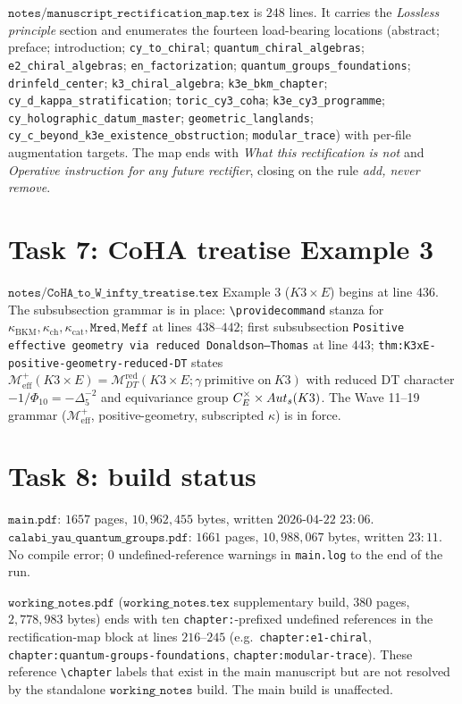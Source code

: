 \documentclass[11pt]{article}
\providecommand{\kch}{\kappa_{\mathrm{ch}}}
\providecommand{\kcat}{\kappa_{\mathrm{cat}}}
\providecommand{\kBKM}{\kappa_{\mathrm{BKM}}}
\begin{document}
$\texttt{notes/manuscript\_rectification\_map.tex}$ is $248$ lines.
It carries the \emph{Lossless principle} section and enumerates
the fourteen load-bearing locations (abstract; preface;
introduction; \texttt{cy\_to\_chiral}; \texttt{quantum\_chiral\_algebras};
\texttt{e2\_chiral\_algebras}; \texttt{en\_factorization};
\texttt{quantum\_groups\_foundations}; \texttt{drinfeld\_center};
\texttt{k3\_chiral\_algebra}; \texttt{k3e\_bkm\_chapter};
\texttt{cy\_d\_kappa\_stratification}; \texttt{toric\_cy3\_coha};
\texttt{k3e\_cy3\_programme}; \texttt{cy\_holographic\_datum\_master};
\texttt{geometric\_langlands}; \texttt{cy\_c\_beyond\_k3e\_existence\_obstruction};
\texttt{modular\_trace}) with per-file augmentation targets. The
map ends with \emph{What this rectification is not} and \emph{Operative
instruction for any future rectifier}, closing on the rule
\emph{add, never remove}.

\section{Task 7: CoHA treatise Example 3}

$\texttt{notes/CoHA\_to\_W\_infty\_treatise.tex}$ Example 3
($K3 \times E$) begins at line $436$. The subsubsection grammar
is in place: \texttt{\textbackslash providecommand} stanza for
$\kBKM, \kch, \kcat, \texttt{Mred}, \texttt{Meff}$ at lines $438$--$442$;
first subsubsection \texttt{Positive effective geometry via reduced
Donaldson--Thomas} at line $443$; \texttt{thm:K3xE-positive-geometry-reduced-DT}
states $\mathcal{M}^+_{\mathrm{eff}}(K3 \times E) = \mathcal{M}^{\mathrm{red}}_{DT}(K3 \times E; \gamma\ \text{primitive on}\ K3)$
with reduced DT character $-1/\Phi_{10} = -\Delta_5^{-2}$ and
equivariance group $C^\times_E \times Aut_s(K3)$. The
Wave 11--19 grammar ($\mathcal{M}^+_{\mathrm{eff}}$, positive-geometry,
subscripted $\kappa$) is in force.

\section{Task 8: build status}

$\texttt{main.pdf}$: $1657$ pages, $10{,}962{,}455$ bytes, written
$2026\text{-}04\text{-}22$ $23{:}06$. $\texttt{calabi\_yau\_quantum\_groups.pdf}$:
$1661$ pages, $10{,}988{,}067$ bytes, written $23{:}11$. No compile
error; $0$ undefined-reference warnings in \texttt{main.log} to the
end of the run.

$\texttt{working\_notes.pdf}$ ($\texttt{working\_notes.tex}$
supplementary build, $380$ pages, $2{,}778{,}983$ bytes) ends with
ten \texttt{chapter:}-prefixed undefined references in the
rectification-map block at lines $216$--$245$ (e.g.\
\texttt{chapter:e1-chiral}, \texttt{chapter:quantum-groups-foundations},
\texttt{chapter:modular-trace}). These reference
\texttt{\textbackslash chapter} labels that exist in the main
manuscript but are not resolved by the standalone
$\texttt{working\_notes}$ build. The main build is unaffected.
\end{document}
